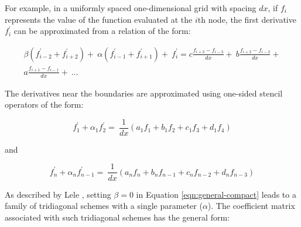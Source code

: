 \documentclass{elsarticle}
\begin{document}

For example,
in a uniformly spaced one-dimensional grid with spacing $dx$,
if $f_i$ represents the value of
the function evaluated at the $i$th node,
the first derivative $f^{\prime}_i$ can be approximated from
a relation of the form:

\begin{equation}
\begin{split}
    \beta(f^{\prime}_{i-2} + f^{\prime}_{i+2}) + \
    \alpha(f^{\prime}_{i-1} + f^{\prime}_{i+1}) + \
        f^{\prime}_i
    = 
    c\frac{f_{i+3} - f_{i-3}}{dx} + \
    b\frac{f_{i+2} - f_{i-2}}{dx} + \\
    a\frac{f_{i+1} - f_{i-1}}{dx} + \
    \hdots
\end{split}
\label{eqn:general-compact}
\end{equation}

The derivatives near the boundaries are approximated using
one-sided stencil operators of the form:

\begin{equation}
f^{\prime}_1 + \alpha_1 f^{\prime}_2 = \
    \frac{1}{dx} (a_1 f_1 + b_1 f_2 + c_1 f_3 + d_1 f_4) 
\end{equation}

and 

\begin{equation}
    f^{\prime}_n + \alpha_n f^{\prime}_{n-1} = \
    \frac{1}{dx} (a_n f_n + b_n f_{n-1} + c_n f_{n-2} + d_n f_{n-3}) 
\end{equation}

As described by Lele \cite{lele1992compact},
setting $\beta = 0$ in Equation \ref{eqn:general-compact} leads to
a family of tridiagonal schemes with a single parameter ($\alpha$).
The coefficient matrix associated with such tridiagonal schemes
has the general form:
\end{document}
